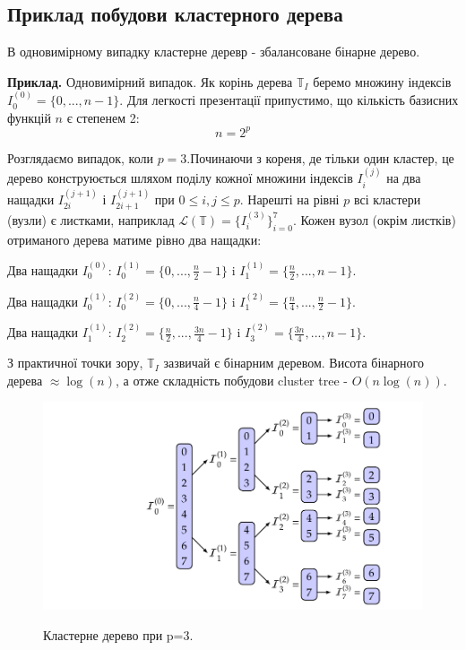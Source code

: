 \documentclass[12pt]{report}
\begin{document}
	\subsection{Приклад побудови кластерного дерева}
	\par В одновимірному випадку кластерне деревр - збалансоване бінарне дерево.
	\par {\bf Приклад.} Одновимірний випадок.\newline
	Як корінь дерева $\mathbb{T}_{I}$ беремо множину індексів $I_0^{(0)}=\{0,...,n-1\}$. Для легкості презентації припустимо, що кількість базисних функцій $n$ є степенем 2:
	$$n=2^p$$ 
	\par Розглядаємо випадок, коли $p=3$.Починаючи з кореня, де тільки один кластер, це дерево конструюється шляхом поділу кожної множини індексів $I_i^{(j)}$ на два нащадки $I_{2i}^{(j+1)}$ і $I_{2i+1}^{(j+1)}$ при $0\le i,j\le p$. Нарешті на рівні $p$ всі кластери (вузли) є листками, наприклад $\mathcal{L}(\mathbb{T})=\{I_i^{(3)}\}_{i=0}^7$. Кожен вузол (окрім листків) отриманого дерева матиме рівно два нащадки:
	\par Два нащадки $I_0^{(0)}$: $I_0^{(1)}=\{0,...,\frac{n}{2}-1\}$  i  $I_1^{(1)}=\{\frac{n}{2},...,n-1\}$. 
	\par Два нащадки $I_0^{(1)}$: $I_0^{(2)}=\{0,...,\frac{n}{4}-1\}$  i  $I_1^{(2)}=\{\frac{n}{4},...,\frac{n}{2}-1\}$.
	\par Два нащадки $I_1^{(1)}$: $I_2^{(2)}=\{\frac{n}{2},...,\frac{3n}{4}-1\}$  i  $I_3^{(2)}=\{\frac{3n}{4},...,n-1\}$.  
	\newline
	\par З практичної точки зору, $\mathbb{T}_{I}$ зазвичай є бінарним деревом. Висота бінарного дерева $\approx\log(n)$, а отже складність побудови cluster tree - $O(n\log(n))$.
	\begin{figure}[bh]{
			\includegraphics[scale=0.5]{1_0}
		}
		\caption{Кластерне дерево при p=3.}
	\end{figure}	
	
\end{document}
